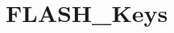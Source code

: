 \hypertarget{group___f_l_a_s_h___keys}{\section{F\-L\-A\-S\-H\-\_\-\-Keys}
\label{group___f_l_a_s_h___keys}
}

